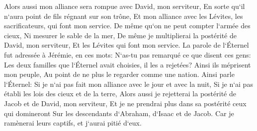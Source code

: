 \verse Alors aussi mon alliance sera rompue avec David, mon serviteur, En sorte qu`il n`aura point de fils régnant sur son trône, Et mon alliance avec les Lévites, les sacrificateurs, qui font mon service. 
\verse De même qu`on ne peut compter l`armée des cieux, Ni mesurer le sable de la mer, De même je multiplierai la postérité de David, mon serviteur, Et les Lévites qui font mon service. 
\verse La parole de l`Éternel fut adressée à Jérémie, en ces mots: 
\verse N`as-tu pas remarqué ce que disent ces gens: Les deux familles que l`Éternel avait choisies, il les a rejetées? Ainsi ils méprisent mon peuple, Au point de ne plus le regarder comme une nation. 
\verse Ainsi parle l`Éternel: Si je n`ai pas fait mon alliance avec le jour et avec la nuit, Si je n`ai pas établi les lois des cieux et de la terre, 
\verse Alors aussi je rejetterai la postérité de Jacob et de David, mon serviteur, Et je ne prendrai plus dans sa postérité ceux qui domineront Sur les descendants d`Abraham, d`Isaac et de Jacob. Car je ramènerai leurs captifs, et j`aurai pitié d`eux. 

\chapter{}

